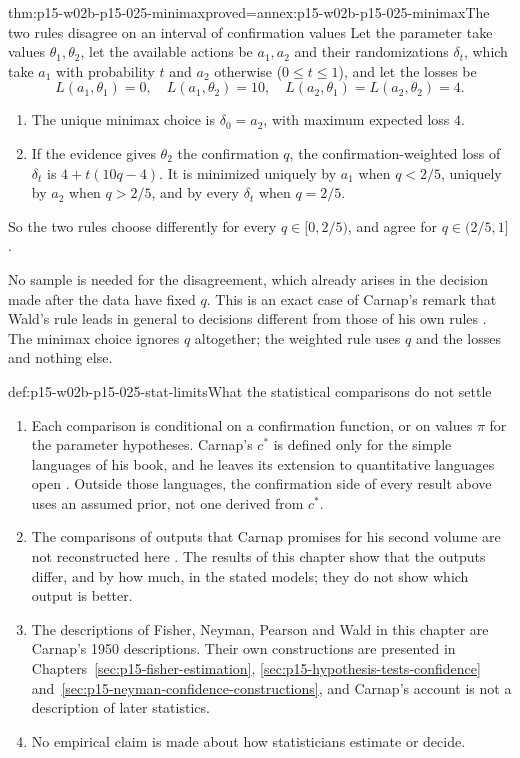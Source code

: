 \begin{hbtheorem}{thm:p15-w02b-p15-025-minimax}{proved=annex:p15-w02b-p15-025-minimax}{The two rules disagree on an interval of confirmation values}
Let the parameter take values \(\theta_1,\theta_2\), let the available
actions be \(a_1,a_2\) and their randomizations \(\delta_t\), which take
\(a_1\) with probability \(t\) and \(a_2\) otherwise
(\(0\le t\le1\)), and let the losses be
\[
 L(a_1,\theta_1)=0,\quad L(a_1,\theta_2)=10,\quad
 L(a_2,\theta_1)=L(a_2,\theta_2)=4 .
\]
\begin{enumerate}
\item The unique minimax choice is \(\delta_0=a_2\), with maximum
expected loss \(4\).
\item If the evidence gives \(\theta_2\) the confirmation \(q\), the
confirmation-weighted loss of \(\delta_t\) is \(4+t(10q-4)\). It is
minimized uniquely by \(a_1\) when \(q<2/5\), uniquely by \(a_2\) when
\(q>2/5\), and by every \(\delta_t\) when \(q=2/5\).
\end{enumerate}
So the two rules choose differently for every \(q\in[0,2/5)\), and
agree for \(q\in(2/5,1]\).
\end{hbtheorem}

No sample is needed for the disagreement, which already arises in the
decision made after the data have fixed \(q\). This is an exact case of
Carnap's remark that Wald's rule leads in general to decisions
different from those of his own rules
\cite[sec.~98, p.~517]{Carnap1950Probability}. The minimax choice
ignores \(q\) altogether; the weighted rule uses \(q\) and the losses
and nothing else.

\begin{hbwarning}{def:p15-w02b-p15-025-stat-limits}{What the statistical comparisons do not settle}
\begin{enumerate}
\item Each comparison is conditional on a confirmation function, or on
values \(\pi\) for the parameter hypotheses. Carnap's \(c^*\) is defined
only for the simple languages of his book, and he leaves its extension
to quantitative languages open
\cite[sec.~98, p.~519]{Carnap1950Probability}. Outside those languages,
the confirmation side of every result above uses an assumed prior, not
one derived from \(c^*\).
\item The comparisons of outputs that Carnap promises for his second
volume are not reconstructed here
\cite[sec.~98, pp.~515, 518--520]{Carnap1950Probability}. The results of
this chapter show that the outputs differ, and by how much, in the
stated models; they do not show which output is better.
\item The descriptions of Fisher, Neyman, Pearson and Wald in this
chapter are Carnap's 1950 descriptions. Their own constructions are
presented in
Chapters~\ref{sec:p15-fisher-estimation},
\ref{sec:p15-hypothesis-tests-confidence}
and~\ref{sec:p15-neyman-confidence-constructions}, and Carnap's account
is not a description of later statistics.
\item No empirical claim is made about how statisticians estimate or
decide.
\end{enumerate}
\end{hbwarning}

